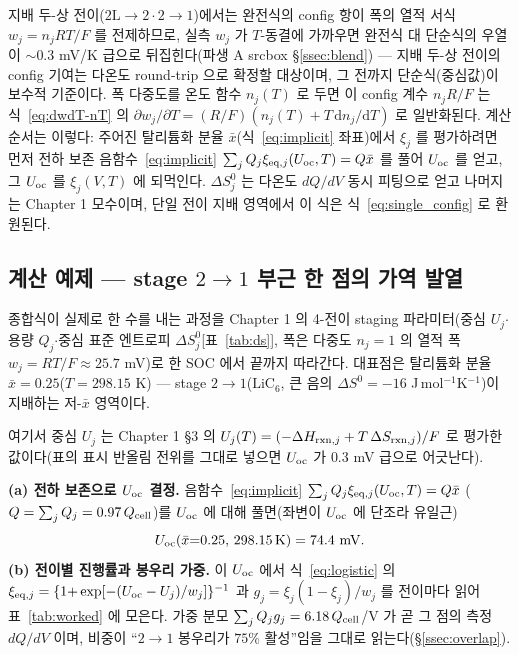지배 두-상 전이($2\mathrm L\!\to\!2\cdot2\!\to\!1$)에서는 완전식의 config 항이 폭의 열적 서식 $w_j=n_jRT/F$ 를
전제하므로, 실측 $w_j$ 가 $T$-동결에 가까우면 완전식 대 단순식의 우열이 $\sim$0.3 mV/K 급으로 뒤집힌다(파생 A
srcbox \S\ref{ssec:blend}) --- 지배 두-상 전이의 config 기여는 다온도 round-trip 으로 확정할 대상이며, 그
전까지 단순식(중심값)이 보수적 기준이다. 폭 다중도를 온도 함수 $n_j(T)$ 로 두면 이 config 계수 $n_jR/F$ 는
식~\eqref{eq:dwdT-nT} 의 $\partial w_j/\partial T=(R/F)(n_j(T)+T\,\mathrm{d}n_j/\mathrm{d}T)$ 로 일반화된다.
계산 순서는 이렇다: 주어진 탈리튬화 분율 $\bar x$(식~\eqref{eq:implicit} 좌표)에서 $\xi_j$ 를 평가하려면 먼저
전하 보존 음함수~\eqref{eq:implicit} $\sum_j Q_j\xi_{\mathrm{eq},j}(U_{\mathrm{oc}},T)=Q\bar x$ 를 풀어 $U_{\mathrm{oc}}$ 를 얻고, 그
$U_{\mathrm{oc}}$ 를 $\xi_j(V,T)$ 에 되먹인다. $\Delta S^0_j$ 는 다온도 $dQ/dV$ 동시 피팅으로 얻고 나머지는 Chapter 1
모수이며, 단일 전이 지배 영역에서 이 식은 식~\eqref{eq:single_config} 로 환원된다.

\subsection{계산 예제 --- stage $2\!\to\!1$ 부근 한 점의 가역 발열}\label{ssec:worked}
종합식이 실제로 한 수를 내는 과정을 Chapter 1 의 4-전이 staging 파라미터(중심 $U_j$$\cdot$용량 $Q_j$$\cdot$중심
표준 엔트로피 $\Delta S^0_j$[표~\ref{tab:ds}], 폭은 다중도 $n_j{=}1$ 의 열적 폭 $w_j{=}RT/F\!\approx\!25.7$ mV)로
한 SOC 에서 끝까지 따라간다. 대표점은 탈리튬화 분율 $\bar x=0.25$($T=298.15$ K) --- stage
$2\!\to\!1$($\mathrm{LiC_6}$, 큰 음의 $\Delta S^0=-16$ J\,mol$^{-1}$K$^{-1}$)이 지배하는 저-$\bar x$ 영역이다.

여기서 중심 $U_j$ 는 Chapter 1 §3 의 $U_j(T)=(-\Delta H_{\mathrm{rxn},j}+T\,\Delta S_{\mathrm{rxn},j})/F$ 로 평가한
값이다(표의 표시 반올림 전위를 그대로 넣으면 $U_{\mathrm{oc}}$ 가 $0.3$ mV 급으로 어긋난다).

\textbf{(a) 전하 보존으로 $U_{\mathrm{oc}}$ 결정.} 음함수~\eqref{eq:implicit} $\sum_jQ_j\xi_{\mathrm{eq},j}(U_{\mathrm{oc}},T)=Q\bar x$
($Q=\sum_jQ_j=0.97\,Q_{\mathrm{cell}}$)를 $U_{\mathrm{oc}}$ 에 대해 풀면(좌변이 $U_{\mathrm{oc}}$ 에 단조라 유일근)
\begin{equation*}
U_\oc(\bar x{=}0.25,\,298.15\,\mathrm K)=74.4\ \mathrm{mV}.
\end{equation*}
\textbf{(b) 전이별 진행률과 봉우리 가중.} 이 $U_{\mathrm{oc}}$ 에서 식~\eqref{eq:logistic} 의
$\xi_{\mathrm{eq},j}=\{1{+}\exp[-(U_{\mathrm{oc}}-U_j)/w_j]\}^{-1}$ 과 $g_j=\xi_j(1-\xi_j)/w_j$ 를 전이마다 읽어 표~\ref{tab:worked}
에 모은다. 가중 분모 $\sum_jQ_jg_j=6.18\,Q_{\mathrm{cell}}$/V 가 곧 그 점의 측정 $dQ/dV$ 이며, 비중이 ``$2\!\to\!1$
봉우리가 $75\%$ 활성''임을 그대로 읽는다(\S\ref{ssec:overlap}).

